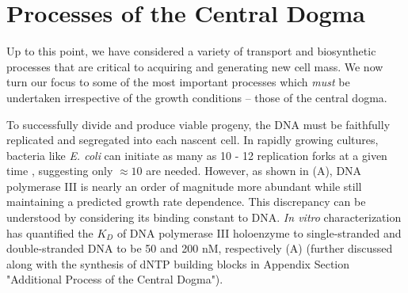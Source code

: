 \section{Processes of the Central Dogma}
Up to this point, we have considered a variety of transport and biosynthetic
processes that are critical to acquiring and generating new cell mass. We now
turn our focus to some of the most important processes which \textit{must} be
undertaken irrespective of the growth conditions -- those of the central dogma.

To successfully divide and produce viable progeny, the DNA must be
faithfully replicated and segregated into each nascent cell.
In rapidly growing cultures, bacteria like \textit{E. coli} can initiate as many
as 10 - 12 replication forks at a given time \citep{bremer2008, si2017},
suggesting  only $\approx 10$ are needed. However, as shown in
(A), DNA polymerase III is nearly an order of magnitude more
abundant while still maintaining a predicted growth rate dependence. This
discrepancy can be understood by considering its binding constant to DNA.
\textit{In vitro} characterization has quantified the $K_D$ of DNA polymerase
III holoenzyme to single-stranded and double-stranded DNA to be 50 and 200 nM,
respectively \citep{ason2000} (A) (further discussed
along with the synthesis of dNTP building blocks in Appendix Section "Additional Process of
the Central Dogma").

